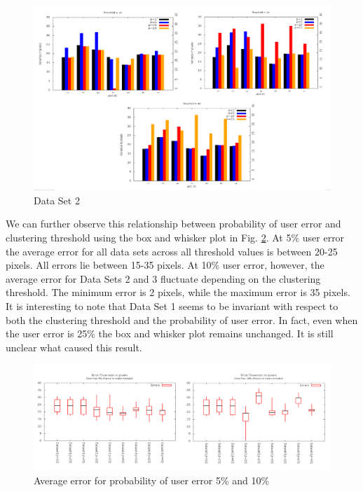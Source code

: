 \documentclass[12pt]{article}
\begin{document}
\begin{figure}[h!]
\centering
\includegraphics[width=6.5in]{GDataPlot9.png}
\caption{Data Set 2}
\label{fig:thresh}
\end{figure}

We can further observe this relationship between probability of user error and clustering threshold using the box and whisker plot in Fig. \ref{fig:whisker}. At 5\% user error the average error for all data sets across all threshold values is between 20-25 pixels. All errors lie between 15-35 pixels. At 10\% user error, however, the average error for Data Sets 2 and 3 fluctuate depending on the clustering threshold. The minimum error is 2 pixels, while the maximum error is 35 pixels. It is interesting to note that Data Set 1 seems to be invariant with respect to both the clustering threshold and the probability of user error. In fact, even when the user error is 25\% the box and whisker plot remains unchanged. It is still unclear what caused this result.   

\begin{figure}[h!]
\centering
\includegraphics[width=6in]{GDataPlot10.png}
\caption{Average error for probability of user error 5\% and 10\%}
\label{fig:whisker}
\end{figure}
\end{document}
